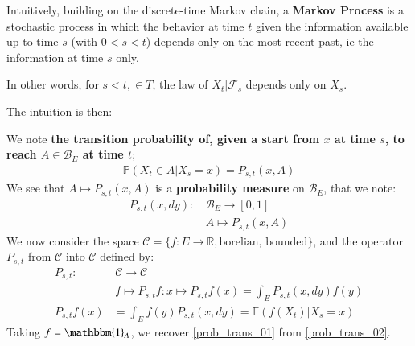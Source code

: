 Intuitively, building on the discrete-time Markov chain, a \textbf{Markov Process} is a stochastic process in which the behavior at time $t$ given the information available up to time $s$ (with $0 < s < t$) depends only on the most recent past, ie the information at time $s$ only. 
    
    In other words, for $s < t, \in T$, the law of $X_t \vert \mathcal{F}_s$ depends only on $X_s$.
    
    The intuition is then:

    We note \textbf{the transition probability of, given a start from $x$ at time $s$, to reach $A \in \mathcal{B}_E$ at time $t$};
    \begin{align}
    \label{prob_trans_01}
        \mathbb{P}(X_t \in A \vert X_s=x) = P_{s,t}(x, A)
    \end{align}
    We see that $A \mapsto P_{s,t}(x,A)$ is a \textbf{probability measure} on $\mathcal{B}_E$, that we note:
    \begin{align}
        P_{s,t}(x,dy) : & \, \mathcal{B}_E \rightarrow [0,1] \\
        &\, A \mapsto P_{s,t}(x,A)
    \end{align}
    We now consider the space $\mathcal{C} = \{ f:E\rightarrow \mathbb{R}, \text{borelian, bounded} \}$, and the operator $P_{s,t}$ from $\mathcal{C}$ into $\mathcal{C}$ defined by:
    \begin{align}
        P_{s,t} : & \, \mathcal{C} \rightarrow \mathcal{C} \\
        &\, f \mapsto P_{s,t}f : x \mapsto P_{s,t}f(x) = \int_E P_{s,t}(x, dy)f(y) \\
        \label{prob_trans_02}
        P_{s,t}f(x) &= \int_E f(y) P_{s,t}(x, dy) = \mathbb{E}(f(X_t) \vert X_s=x)
    \end{align}
    Taking $f =  \mathbbm{1}_A$, we recover \ref{prob_trans_01} from \ref{prob_trans_02}.

   


